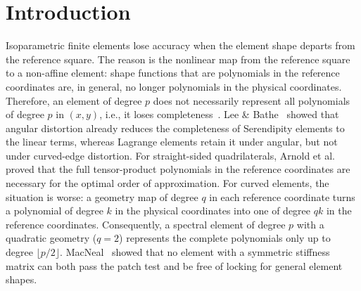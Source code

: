 \section{Introduction}
\label{sec:intro}
%
Isoparametric finite elements lose accuracy when the element shape departs from the reference square. The reason is the nonlinear map from the reference square to a non-affine element: shape functions that are polynomials in the reference coordinates are, in general, no longer polynomials in the physical coordinates. Therefore, an element of degree $p$ does not necessarily represent all polynomials of degree $p$ in $(x,y)$, i.e., it loses completeness~\cite{Rajendran2000completeness}. Lee \& Bathe~\cite{Lee1993effects} showed that angular distortion already reduces the completeness of Serendipity elements to the linear terms, whereas Lagrange elements retain it under angular, but not under curved-edge distortion. For straight-sided quadrilaterals, Arnold et al.~\cite{Arnold2002Approximation} proved that the full tensor-product polynomials in the reference coordinates are necessary for the optimal order of approximation. For curved elements, the situation is worse: a geometry map of degree $q$ in each reference coordinate turns a polynomial of degree $k$ in the physical coordinates into one of degree $qk$ in the reference coordinates. Consequently, a spectral element of degree $p$ with a quadratic geometry ($q=2$) represents the complete polynomials only up to degree $\lfloor p/2\rfloor$. MacNeal~\cite{MacNeal1992On} showed that no element with a symmetric stiffness matrix can both pass the patch test and be free of locking for general element shapes.

